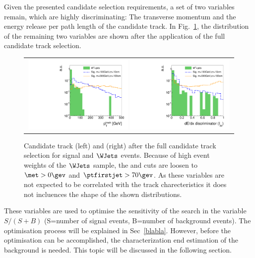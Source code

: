 Given the presented candidate selection requirements, a set of two variables remain, which are highly discriminating:
The transverse momentum and the energy release per path length of the candidate track.
In Fig.~\ref{fig:PtAndIasAfterFullPreselection}, the distribution of the remaining two variables are shown after the application of the full candidate track selection.
\begin{figure}[!tb]
  \centering 
  \begin{tabular}{c}
    \includegraphics[width=0.49\textwidth]{figures/analysis/htrackPtSmallRange_log_chiTracksfullSelection.pdf}
    \includegraphics[width=0.49\textwidth]{figures/analysis/htrackASmiSmallRange_log_chiTracksfullSelection.pdf}
  \end{tabular}
  \caption{Candidate track \pt (left) and \ias (right) after the full candidate track selection for signal and $\WJets$ events. 
           Because of high event weights of the $\WJets$ sample, the \met and \ptfirstjet cuts are loosen to \mbox{$\met>0\gev$} and \mbox{$\ptfirstjet>70\gev$}.
           As these variables are not expected to be correlated with the track charecteristics it does not incluences the shape of the shown distributions.}
  \label{fig:PtAndIasAfterFullPreselection}
\end{figure}
These variables are used to optimise the sensitivity of the search in the variable $S/(S+B)$ (S=number of signal events, B=number of background events).
The optimisation process will be explained in Sec~\ref{blabla}.
However, before the optimisation can be accomplished, the characterization end estimation of the background is needed.
This topic will be discussed in the following section.



